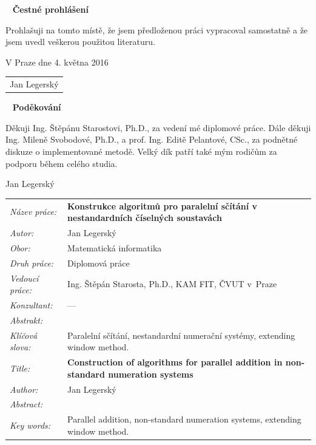\documentclass[a4paper, 11pt, twoside, openright]{report}
\theoremstyle{definition}
\newcommand{\obor}{Matematická informatika}
\newcommand{\nazevcz}{Konstrukce algoritm\r u pro paraleln\'i s\v c\'it\'an\'i  v nestandardn\'ich \v c\'iseln\'ych soustav\'ach}
\newcommand{\nazeven}{Construction of algorithms for parallel addition   in non-standard numeration systems}
\newcommand{\autor}{Jan Legersk\'y}
\newcommand{\vedouci}{Ing. \v St\v ep\'an Starosta, Ph.D.}
\newcommand{\pracovisteVed}{KAM FIT, \v CVUT v~Praze}
\newcommand{\konzultant}{---}
\newcommand{\klicova}{Paraleln\'i s\v c\'it\'an\'i, nestandardn\'i numera\v cn\'i syst\'emy, extending window method.}  %
\newcommand{\keyword}{Parallel addition, non-standard numeration systems, extending window method.}
\newcommand{\abstrCZ}%
{%
}
\newcommand{\abstrEN}{
}
\begin{document}
\begin{titlepage}
\thispagestyle{empty}
~
\vfill
\noindent\textbf{Čestné prohlášení}
\vspace{0.5cm}

Prohla\v suji na tomto m\'ist\v e, \v ze jsem p\v redlo\v zenou pr\'aci vypracoval samostatn\v e a \v ze jsem uvedl ve\v skerou pou\v zitou literaturu.
\vspace{1.5cm}

\noindent
\vspace{5mm}V Praze dne 4. května 2016\hfill
	\begin{tabular}{c}
	\\[40pt]
	\autor
	\end{tabular}
\cleardoublepage


\thispagestyle{empty}
~
\vfill
\noindent\textbf{Pod\v ekov\'an\'i}
\vspace{0.5cm}

Děkuji Ing. Štěpánu Starostovi, Ph.D., za vedení mé diplomové práce. Dále děkuji Ing. Mileně Svobodové, Ph.D., a prof. Ing. Editě Pelantové, CSc., za  podnětné diskuze o implementované metodě. Velký dík patří také mým rodičům za podporu během celého studia.

\begin{flushright}
\autor
\end{flushright}
\cleardoublepage


\thispagestyle{empty}

\begin{tabular}{lp{}}
  {\em N\'azev pr\'ace:} & \bf \nazevcz \\[4mm]
  {\em Autor:} & \autor \\[4mm]
  {\em Obor:} & \obor \\[4mm]
  {\em Druh pr\'ace:} & Diplomová práce \\[4mm]
  {\em Vedoucí práce:} & \vedouci, \pracovisteVed \\[4mm]
  {\em Konzultant:} & \konzultant \\[4mm]
  {\em Abstrakt:} & \abstrCZ \\[4mm]
  {\em Kl\'i\v cov\'a slova:} & \klicova \\[20mm]

  {\em Title:} & \bf \nazeven \\[4mm]
  {\em Author:} & \autor \\[4mm]
  {\em Abstract:} & \abstrEN \\[4mm]
  {\em Key words:} & \keyword
\end{tabular}
\cleardoublepage


\thispagestyle{empty}
\renewcommand\contentsname{\vspace{-3cm} Contents \vspace{-0.8cm}}
\tableofcontents
\thispagestyle{empty}

\cleardoublepage
\thispagestyle{empty}

\thispagestyle{empty}
\cleardoublepage
\end{titlepage}
\end{document}
